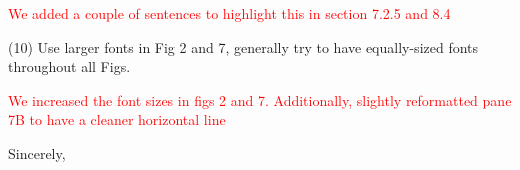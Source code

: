 \documentclass[11pt,a4paper]{letter} %
\begin{document}
\begin{letter}
\textcolor{red}{We added a couple of sentences to highlight this in section 7.2.5 and 8.4}

(10) Use larger fonts in Fig 2 and 7, generally try to have equally-sized fonts throughout all Figs.

\textcolor{red}{We increased the font sizes in figs 2 and 7. Additionally, slightly reformatted pane 7B to have a cleaner horizontal line}



\closing{Sincerely,\\[2mm]
}


\end{letter}
\end{document}
